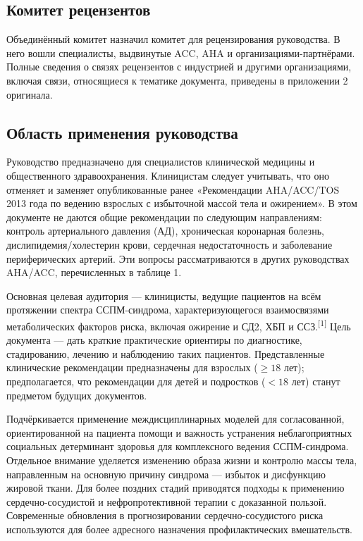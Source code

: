 \documentclass[11pt,a4paper]{article}
\newcommand{\src}[1]{\textsuperscript{[#1]}}
\begin{document}
\subsection{Комитет рецензентов}
Объединённый комитет назначил комитет для рецензирования руководства. В него вошли специалисты, выдвинутые ACC, AHA и организациями-партнёрами. Полные сведения о связях рецензентов с индустрией и другими организациями, включая связи, относящиеся к тематике документа, приведены в приложении 2 оригинала.

\subsection{Область применения руководства}
Руководство предназначено для специалистов клинической медицины и общественного здравоохранения. Клиницистам следует учитывать, что оно отменяет и заменяет опубликованные ранее «Рекомендации AHA/ACC/TOS 2013 года по ведению взрослых с избыточной массой тела и ожирением». В этом документе не даются общие рекомендации по следующим направлениям: контроль артериального давления (АД), хроническая коронарная болезнь, дислипидемия/холестерин крови, сердечная недостаточность и заболевание периферических артерий. Эти вопросы рассматриваются в других руководствах AHA/ACC, перечисленных в таблице 1.

Основная целевая аудитория --- клиницисты, ведущие пациентов на всём протяжении спектра ССПМ-синдрома, характеризующегося взаимосвязями метаболических факторов риска, включая ожирение и СД2, ХБП и ССЗ.\src{1} Цель документа --- дать краткие практические ориентиры по диагностике, стадированию, лечению и наблюдению таких пациентов. Представленные клинические рекомендации предназначены для взрослых ($\geq18$ лет); предполагается, что рекомендации для детей и подростков ($<18$ лет) станут предметом будущих документов.

Подчёркивается применение междисциплинарных моделей для согласованной, ориентированной на пациента помощи и важность устранения неблагоприятных социальных детерминант здоровья для комплексного ведения ССПМ-синдрома. Отдельное внимание уделяется изменению образа жизни и контролю массы тела, направленным на основную причину синдрома --- избыток и дисфункцию жировой ткани. Для более поздних стадий приводятся подходы к применению сердечно-сосудистой и нефропротективной терапии с доказанной пользой. Современные обновления в прогнозировании сердечно-сосудистого риска используются для более адресного назначения профилактических вмешательств.
\end{document}
